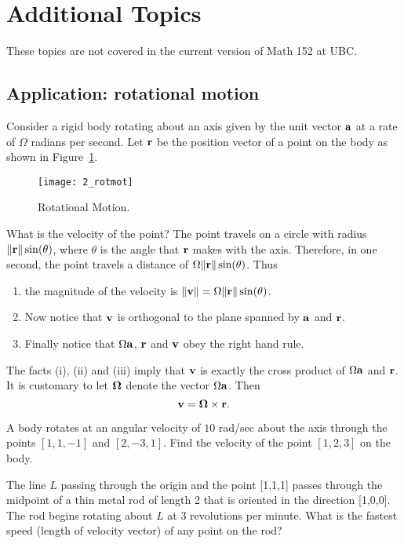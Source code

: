 \section{Additional Topics}

These topics are not covered in the current version of Math 152 at UBC.

\subsection{Application: rotational motion}

Consider a rigid body rotating about an axis given by the unit vector
$\aa$ at a rate of $\Omega$ radians per second. Let $\rr$ be the
position vector of a point on the body as shown in Figure~\ref{fig_rotmot}.

\begin{figure}
\centerline{\texttt{[image: 2\_rotmot]}}
\caption{Rotational Motion. \label{fig_rotmot}}
\end{figure}

What is the velocity of the point? The point travels on a
circle with radius $\|\rr\|\sin(\theta)$, where $\theta$ is the angle that
$\rr$ makes with the axis. Therefore, in one second, the point travels a 
distance of $\Omega\|\rr\|\sin(\theta)$. Thus
{\begin{enumerate}
\renewcommand{\labelenumi}{(\roman{enumi})}
\item the magnitude of the velocity
is $\|{\bf v}\| = \Omega\|\rr\|\sin(\theta)$.
\item Now notice that ${\bf v}$ is
orthogonal to the plane spanned by $\aa$ and $\rr$.
\item Finally notice that $\Omega\aa$, $\rr$ and $\vv$ obey the right
hand rule.
\end{enumerate}}
The facts (i), (ii) and (iii) imply that $\vv$ is exactly the cross
product of $\Omega\aa$ and $\rr$. It is customary to let $\bf\Omega$
denote the vector $\Omega\aa$. Then
\[
{\bf v} = {\bf\Omega}\times\rr.
\]

\begin{problem}
\label{op1_19}
A body rotates at an angular velocity of $10$ rad/sec about the axis
through the points $[1,1,-1]$ and $[2,-3,1]$.  Find the velocity of
the point $[1,2,3]$ on the body.
\end{problem}

\begin{problem}
\label{2009_a2_2}
The line $L$ passing through the origin and the point
[1,1,1] passes through the midpoint of a thin metal rod of length
2 that is oriented in the direction [1,0,0]. The rod begins rotating
about $L$ at 3 revolutions per minute. What is the fastest speed
(length of velocity vector) of any point on the rod?
\end{problem}

